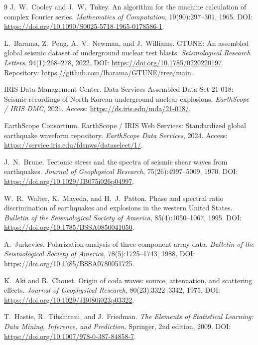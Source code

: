 \documentclass[11pt,a4paper]{article}
\begin{document}
\begin{thebibliography}{9}\setlength{\itemsep}{0.25em}
J.~W.~Cooley and J.~W.~Tukey.
\newblock An algorithm for the machine calculation of complex Fourier series.
\newblock \emph{Mathematics of Computation}, 19(90):297--301, 1965.
\newblock DOI: \url{https://doi.org/10.1090/S0025-5718-1965-0178586-1}.

L.~Barama, Z.~Peng, A.~V.~Newman, and J.~Williams.
\newblock GTUNE: An assembled global seismic dataset of underground nuclear test blasts.
\newblock \emph{Seismological Research Letters}, 94(1):268--278, 2022.
\newblock DOI: \url{https://doi.org/10.1785/0220220197}. Repository: \url{https://github.com/lbarama/GTUNE/tree/main}.

IRIS Data Management Center.
\newblock Data Services Assembled Data Set 21-018: Seismic recordings of North Korean underground nuclear explosions.
\newblock \emph{EarthScope / IRIS DMC}, 2021.
\newblock Access: \url{https://ds.iris.edu/mda/21-018/}.

EarthScope Consortium.
\newblock EarthScope / IRIS Web Services: Standardized global earthquake waveform repository.
\newblock \emph{EarthScope Data Services}, 2024.
\newblock Access: \url{https://service.iris.edu/fdsnws/dataselect/1/}.

J.~N.~Brune.
\newblock Tectonic stress and the spectra of seismic shear waves from earthquakes.
\newblock \emph{Journal of Geophysical Research}, 75(26):4997--5009, 1970.
\newblock DOI: \url{https://doi.org/10.1029/JB075i026p04997}.

W.~R.~Walter, K.~Mayeda, and H.~J.~Patton.
\newblock Phase and spectral ratio discrimination of earthquakes and explosions in the western United States.
\newblock \emph{Bulletin of the Seismological Society of America}, 85(4):1050--1067, 1995.
\newblock DOI: \url{https://doi.org/10.1785/BSSA0850041050}.

A.~Jurkevics.
\newblock Polarization analysis of three-component array data.
\newblock \emph{Bulletin of the Seismological Society of America}, 78(5):1725--1743, 1988.
\newblock DOI: \url{https://doi.org/10.1785/BSSA0780051725}.

K.~Aki and B.~Chouet.
\newblock Origin of coda waves: source, attenuation, and scattering effects.
\newblock \emph{Journal of Geophysical Research}, 80(23):3322--3342, 1975.
\newblock DOI: \url{https://doi.org/10.1029/JB080i023p03322}.

T.~Hastie, R.~Tibshirani, and J.~Friedman.
\newblock \emph{The Elements of Statistical Learning: Data Mining, Inference, and Prediction}.
\newblock Springer, 2nd edition, 2009.
\newblock DOI: \url{https://doi.org/10.1007/978-0-387-84858-7}.
\end{thebibliography}
\end{document}
